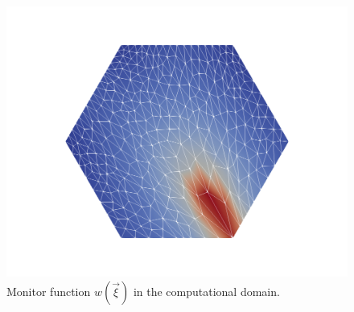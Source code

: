 \documentclass[a4paper,11pt]{article}
\begin{document}
\begin{figure}[h!]
    \centering
    \includegraphics[scale=0.2]{Images/Test1/r-adaptive/w_c.png}
    \caption{Monitor function $w(\vec{\xi})$ in the computational domain.}
    \label{fig:monitor_comp}
\end{figure}




\end{document}
